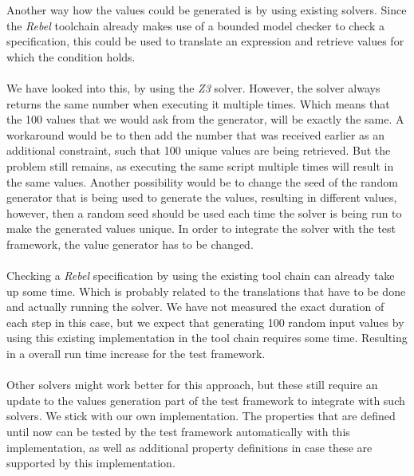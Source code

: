 Another way how the values could be generated is by using existing solvers.
Since the \textit{Rebel} toolchain already makes
use of a bounded model checker to check a specification, this could be used to
translate an expression and retrieve values for which the condition holds.\\
\\
We have looked into this, by using the \textit{Z3} solver. However, the solver
always returns the same number when executing it multiple times. Which means
that the 100 values that we would ask from the generator, will be exactly the
same. A workaround would be to then add the number that was received earlier as
an additional constraint, such that 100 unique values are being retrieved. But
the problem still remains, as executing the same script multiple times will
result in the same values. Another possibility would be to change the seed of
the random generator that is being used to generate the values, resulting in
different values, however, then a random seed should be used each time the
solver is being run to make the generated values unique. In order to integrate
the solver with the test framework, the value generator has to be changed.\\
\\
Checking a \textit{Rebel} specification by using the existing tool chain can already take up some time. Which is probably
related to the translations that have to be done and actually running the
solver. We have not measured the exact duration of each step in this case, but
we expect that generating 100 random input values by using this existing implementation in the tool chain
requires some time. Resulting in a overall run time increase for the test
framework.\\
\\
Other solvers might work better for this approach, but these still require an
update to the values generation part of the test framework to integrate with
such solvers. We stick with our own implementation. The properties that are defined until now can be tested by the test framework automatically with this implementation, as well as additional property definitions in case these are supported by this implementation.

